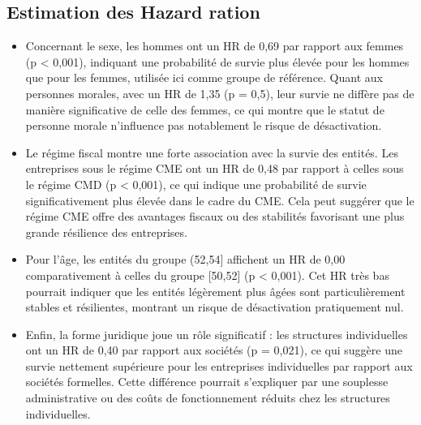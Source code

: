\documentclass[a4paper,12pt]{report}
\begin{document}
\newpage
\subsection{Estimation des Hazard ration}


\noindent
\begin{itemize}
    \item Concernant le sexe, les hommes ont un HR de 0,69 par rapport aux femmes (p < 0,001), indiquant une probabilité de survie plus élevée pour les hommes que pour les femmes, utilisée ici comme groupe de référence. Quant aux personnes morales, avec un HR de 1,35 (p = 0,5), leur survie ne diffère pas de manière significative de celle des femmes, ce qui montre que le statut de personne morale n’influence pas notablement le risque de désactivation.

    \item Le régime fiscal montre une forte association avec la survie des entités. Les entreprises sous le régime CME ont un HR de 0,48 par rapport à celles sous le régime CMD (p < 0,001), ce qui indique une probabilité de survie significativement plus élevée dans le cadre du CME. Cela peut suggérer que le régime CME offre des avantages fiscaux ou des stabilités favorisant une plus grande résilience des entreprises.

    \item Pour l’âge, les entités du groupe (52,54] affichent un HR de 0,00 comparativement à celles du groupe [50,52] (p < 0,001). Cet HR très bas pourrait indiquer que les entités légèrement plus âgées sont particulièrement stables et résilientes, montrant un risque de désactivation pratiquement nul.

    \item Enfin, la forme juridique joue un rôle significatif : les structures individuelles ont un HR de 0,40 par rapport aux sociétés (p = 0,021), ce qui suggère une survie nettement supérieure pour les entreprises individuelles par rapport aux sociétés formelles. Cette différence pourrait s’expliquer par une souplesse administrative ou des coûts de fonctionnement réduits chez les structures individuelles.
\end{itemize}
\end{document}
